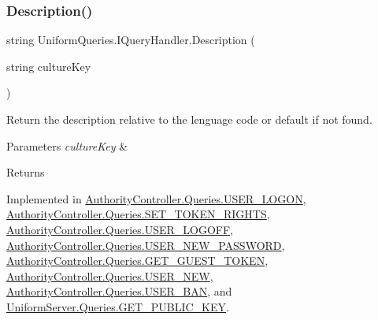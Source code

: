 \subsubsection{\texorpdfstring{Description()}{Description()}}
{\footnotesize\ttfamily string Uniform\+Queries.\+I\+Query\+Handler.\+Description (\begin{DoxyParamCaption}\item[{string}]{culture\+Key }\end{DoxyParamCaption})}



Return the description relative to the lenguage code or default if not found. 


\begin{DoxyParams}{Parameters}
{\em culture\+Key} & \\
\hline
\end{DoxyParams}
\begin{DoxyReturn}{Returns}

\end{DoxyReturn}


Implemented in \mbox{\hyperlink{class_authority_controller_1_1_queries_1_1_u_s_e_r___l_o_g_o_n_af448426be46032c3ae103cdf4ea5f40b}{Authority\+Controller.\+Queries.\+U\+S\+E\+R\+\_\+\+L\+O\+G\+ON}}, \mbox{\hyperlink{class_authority_controller_1_1_queries_1_1_s_e_t___t_o_k_e_n___r_i_g_h_t_s_a149fb8950cf0ebbcb47b6a238c6458d2}{Authority\+Controller.\+Queries.\+S\+E\+T\+\_\+\+T\+O\+K\+E\+N\+\_\+\+R\+I\+G\+H\+TS}}, \mbox{\hyperlink{class_authority_controller_1_1_queries_1_1_u_s_e_r___l_o_g_o_f_f_a2cb738d74699241341b691cc55b57e1d}{Authority\+Controller.\+Queries.\+U\+S\+E\+R\+\_\+\+L\+O\+G\+O\+FF}}, \mbox{\hyperlink{class_authority_controller_1_1_queries_1_1_u_s_e_r___n_e_w___p_a_s_s_w_o_r_d_a04d2af1732d4ac353076d489fe75c696}{Authority\+Controller.\+Queries.\+U\+S\+E\+R\+\_\+\+N\+E\+W\+\_\+\+P\+A\+S\+S\+W\+O\+RD}}, \mbox{\hyperlink{class_authority_controller_1_1_queries_1_1_g_e_t___g_u_e_s_t___t_o_k_e_n_a72902cb3b94f31ec4f8e6cd0bb1f2ed8}{Authority\+Controller.\+Queries.\+G\+E\+T\+\_\+\+G\+U\+E\+S\+T\+\_\+\+T\+O\+K\+EN}}, \mbox{\hyperlink{class_authority_controller_1_1_queries_1_1_u_s_e_r___n_e_w_ab0995d0559e0033ea963acaccb6e37bf}{Authority\+Controller.\+Queries.\+U\+S\+E\+R\+\_\+\+N\+EW}}, \mbox{\hyperlink{class_authority_controller_1_1_queries_1_1_u_s_e_r___b_a_n_a0635966a71b389cbb4354e61e3c52513}{Authority\+Controller.\+Queries.\+U\+S\+E\+R\+\_\+\+B\+AN}}, and \mbox{\hyperlink{class_uniform_server_1_1_queries_1_1_g_e_t___p_u_b_l_i_c___k_e_y_aee414e6882494609ed576f061d662dc2}{Uniform\+Server.\+Queries.\+G\+E\+T\+\_\+\+P\+U\+B\+L\+I\+C\+\_\+\+K\+EY}}.

